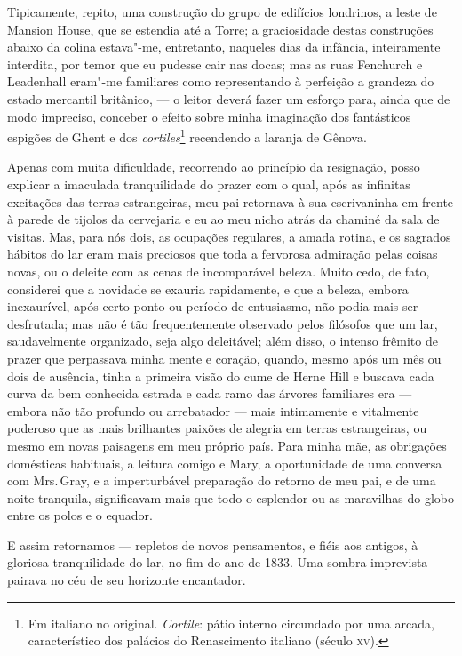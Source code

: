 Tipicamente, repito, uma construção do grupo de edifícios londrinos, a
leste de Mansion House, que se estendia até a Torre; a graciosidade
destas construções abaixo da colina estava"-me, entretanto, naqueles dias
da infância, inteiramente interdita, por temor que eu pudesse cair nas
docas; mas as ruas Fenchurch e Leadenhall eram"-me familiares como
representando à perfeição a grandeza do estado mercantil britânico, --- o
leitor deverá fazer um esforço para, ainda que de modo impreciso,
conceber o efeito sobre minha imaginação dos fantásticos espigões de
Ghent e dos \textit{cortiles}\footnote{Em italiano no original.
  \textit{Cortile}: pátio interno circundado por uma arcada,
  característico dos palácios do Renascimento italiano (século \textsc{xv}).} recendendo a laranja de Gênova.

Apenas com muita dificuldade, recorrendo ao princípio da
resignação, posso explicar a imaculada tranquilidade do prazer com o
qual, após as infinitas excitações das terras estrangeiras, meu pai
retornava à sua escrivaninha em frente à parede de tijolos da cervejaria
e eu ao meu nicho atrás da chaminé da sala de visitas. Mas, para nós
dois, as ocupações regulares, a amada rotina, e os sagrados hábitos do
lar eram mais preciosos que toda a fervorosa admiração pelas coisas
novas, ou o deleite com as cenas de incomparável beleza. Muito cedo, de
fato, considerei que a novidade se exauria rapidamente, e que a beleza,
embora inexaurível, após certo ponto ou período de entusiasmo, não podia
mais ser desfrutada; mas não é tão frequentemente observado pelos
filósofos que um lar, saudavelmente organizado, seja algo deleitável;
além disso, o intenso frêmito de prazer que perpassava minha mente e
coração, quando, mesmo após um mês ou dois de ausência, tinha a primeira
visão do cume de Herne Hill e buscava cada curva da bem conhecida
estrada e cada ramo das árvores familiares era --- embora não tão
profundo ou arrebatador --- mais intimamente e vitalmente poderoso que as
mais brilhantes paixões de alegria em terras estrangeiras, ou mesmo em
novas paisagens em meu próprio país. Para minha mãe, as obrigações
domésticas habituais, a leitura comigo e Mary, a oportunidade de uma
conversa com Mrs.\,Gray, e a imperturbável preparação do retorno de meu
pai, e de uma noite tranquila, significavam mais que todo o esplendor ou
as maravilhas do globo entre os polos e o equador.

E assim retornamos --- repletos de novos pensamentos, e fiéis aos
antigos, à gloriosa tranquilidade do lar, no fim do ano de 1833. Uma
sombra imprevista pairava no céu de seu horizonte encantador.

